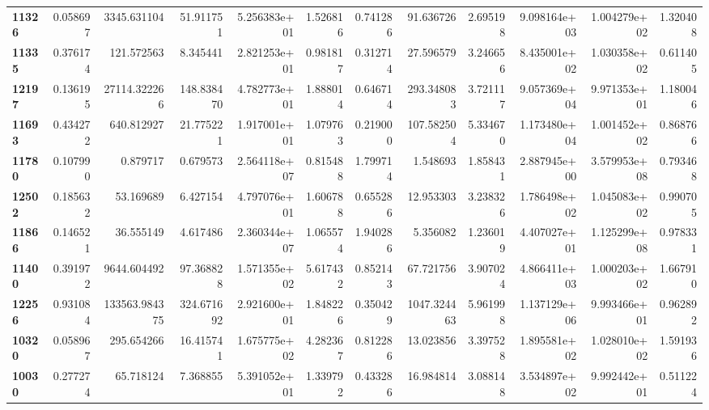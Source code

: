 \begin{table}[h]
\begin{tabular}{lrrrrrrrrrrr}
\textbf{11326} &  0.058697 &    3345.631104 &       51.911751 &               5.256383e+01 &  1.526816 &  0.741286 &    91.636726 &   2.695198 &  9.098164e+03 &  1.004279e+02 &     1.320408 \\
\textbf{11335} &  0.376174 &     121.572563 &        8.345441 &               2.821253e+01 &  0.981817 &  0.312714 &    27.596579 &   3.246656 &  8.435001e+02 &  1.030358e+02 &     0.611405 \\
\textbf{12197} &  0.136195 &   27114.322266 &      148.838470 &               4.782773e+01 &  1.888014 &  0.646714 &   293.348083 &   3.721117 &  9.057369e+04 &  9.971353e+01 &     1.180046 \\
\textbf{11693} &  0.434272 &     640.812927 &       21.775221 &               1.917001e+01 &  1.079763 &  0.219000 &   107.582504 &   5.334670 &  1.173480e+04 &  1.001452e+02 &     0.868766 \\
\textbf{11780} &  0.107990 &       0.879717 &        0.679573 &               2.564118e+07 &  0.815488 &  1.799714 &     1.548693 &   1.858431 &  2.887945e+00 &  3.579953e+08 &     0.793468 \\
\textbf{12502} &  0.185632 &      53.169689 &        6.427154 &               4.797076e+01 &  1.606788 &  0.655286 &    12.953303 &   3.238326 &  1.786498e+02 &  1.045083e+02 &     0.990705 \\
\textbf{11866} &  0.146521 &      36.555149 &        4.617486 &               2.360344e+07 &  1.065574 &  1.940286 &     5.356082 &   1.236019 &  4.407027e+01 &  1.125299e+08 &     0.978331 \\
\textbf{11400} &  0.391972 &    9644.604492 &       97.368828 &               1.571355e+02 &  5.617432 &  0.852143 &    67.721756 &   3.907024 &  4.866411e+03 &  1.000203e+02 &     1.667910 \\
\textbf{12256} &  0.931084 &  133563.984375 &      324.671692 &               2.921600e+01 &  1.848226 &  0.350429 &  1047.324463 &   5.961998 &  1.137129e+06 &  9.993466e+01 &     0.962892 \\
\textbf{10320} &  0.058967 &     295.654266 &       16.415741 &               1.675775e+02 &  4.282367 &  0.812286 &    13.023856 &   3.397528 &  1.895581e+02 &  1.028010e+02 &     1.591936 \\
\textbf{10030} &  0.277274 &      65.718124 &        7.368855 &               5.391052e+01 &  1.339792 &  0.433286 &    16.984814 &   3.088148 &  3.534897e+02 &  9.992442e+01 &     0.511224 \\
\bottomrule
\end{tabular}
\end{table}
